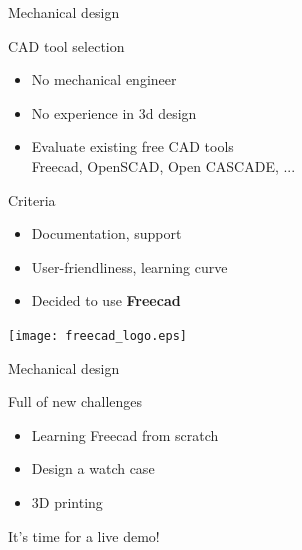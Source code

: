 \documentclass[compress,red]{beamer}
\begin{document}
\begin{frame}{Mechanical design}

  CAD tool selection

  \begin{itemize}
  \item No mechanical engineer
  \item No experience in 3d design
  \item Evaluate existing free CAD tools \\
    Freecad, OpenSCAD, Open CASCADE, ...
  \end{itemize}

  \pause
  Criteria

  \begin{itemize}
  \item Documentation, support
  \item User-friendliness, learning curve
  \end{itemize}

  \pause
  \begin{itemize}
  \item Decided to use \textbf{Freecad}
  \end{itemize}

  \begin{center}
    \texttt{[image: freecad\_logo.eps]}
  \end{center}

  \note{}

\end{frame}

\begin{frame}{Mechanical design}

  Full of new challenges

  \begin{itemize}
  \item Learning Freecad from scratch
  \item Design a watch case
  \item 3D printing
  \end{itemize}

  \pause
  \vskip 6mm
  It's time for a live demo!


\end{frame}
\end{document}

